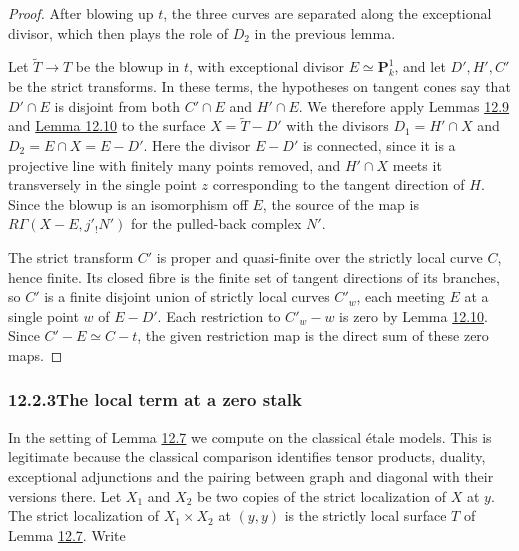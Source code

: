 \documentclass[11pt]{article}
\begin{document}
\begin{proof}[{Proof}]\label{bp260}%
After blowing up \(t\), the three curves are separated along the exceptional divisor, which then plays the role of \(D_2\) in the previous lemma.

Let \(\widetilde T\to T\) be the blowup in \(t\), with exceptional divisor \(E\simeq\mathbf P^1_k\), and let \(D',H',C'\) be the strict transforms. In these terms, the hypotheses on tangent cones say that \(D'\cap E\) is disjoint from both \(C'\cap E\) and \(H'\cap E\). We therefore apply Lemmas \hyperref[bp253]{12.9} and \hyperref[bp256]{Lemma 12.10} to the surface \(X=\widetilde T-D'\) with the divisors \(D_1=H'\cap X\) and \(D_2=E\cap X=E-D'\). Here the divisor \(E-D'\) is connected, since it is a projective line with finitely many points removed, and \(H'\cap X\) meets it transversely in the single point \(z\) corresponding to the tangent direction of \(H\). Since the blowup is an isomorphism off \(E\), the source of the map is \(R\Gamma(X-E,j'_!N')\) for the pulled-back complex \(N'\).

The strict transform \(C'\) is proper and quasi-finite over the strictly local curve \(C\), hence finite. Its closed fibre is the finite set of tangent directions of its branches, so \(C'\) is a finite disjoint union of strictly local curves \(C'_w\), each meeting \(E\) at a single point \(w\) of \(E-D'\). Each restriction to \(C'_w-w\) is zero by Lemma \hyperref[bp256]{12.10}. Since \(C'-E\simeq C-t\), the given restriction map is the direct sum of these zero maps.
\end{proof}


\subsubsection*{\texorpdfstring{12.2.3\quad The local term at a zero stalk}{12.2.3 The local term at a zero stalk}}
\label{bp261}%
\label{bp262}%
In the setting of Lemma \hyperref[bp246]{12.7} we compute on the classical étale models. This is legitimate because the classical comparison identifies tensor products, duality, exceptional adjunctions and the pairing between graph and diagonal with their versions there. Let \(X_1\) and \(X_2\) be two copies of the strict localization of \(X\) at \(y\). The strict localization of \(X_1\times X_2\) at \((y,y)\) is the strictly local surface \(T\) of Lemma \hyperref[bp246]{12.7}. Write
\end{document}
